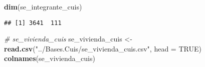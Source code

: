 \documentclass[11pt,]{article}
\newenvironment{Shaded}{\begin{snugshade}}{\end{snugshade}}
\newcommand{\KeywordTok}[1]{\textcolor[rgb]{0.13,0.29,0.53}{\textbf{#1}}}
\newcommand{\DataTypeTok}[1]{\textcolor[rgb]{0.13,0.29,0.53}{#1}}
\newcommand{\StringTok}[1]{\textcolor[rgb]{0.31,0.60,0.02}{#1}}
\newcommand{\CommentTok}[1]{\textcolor[rgb]{0.56,0.35,0.01}{\textit{#1}}}
\newcommand{\OtherTok}[1]{\textcolor[rgb]{0.56,0.35,0.01}{#1}}
\newcommand{\NormalTok}[1]{#1}
\begin{document}
\begin{Shaded}
\begin{Highlighting}[]
\KeywordTok{dim}\NormalTok{(se_integrante_cuis)}
\end{Highlighting}
\end{Shaded}

\begin{verbatim}
## [1] 3641  111
\end{verbatim}

\begin{Shaded}
\begin{Highlighting}[]
\CommentTok{# se_vivienda_cuis}
\NormalTok{se_vivienda_cuis <-}\StringTok{ }\KeywordTok{read.csv}\NormalTok{(}\StringTok{"../Bases.Cuis/se_vivienda_cuis.csv"}\NormalTok{, }\DataTypeTok{head =} \OtherTok{TRUE}\NormalTok{)}
\KeywordTok{colnames}\NormalTok{(se_vivienda_cuis)}
\end{Highlighting}
\end{Shaded}
\end{document}
